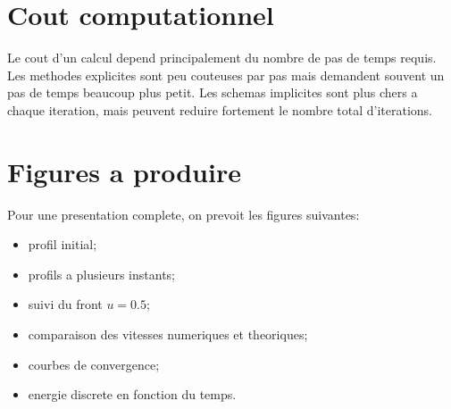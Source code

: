\documentclass[11pt,a4paper]{report}
\begin{document}
\section{Cout computationnel}
Le cout d'un calcul depend principalement du nombre de pas de temps requis.
Les methodes explicites sont peu couteuses par pas mais demandent souvent un pas de temps
beaucoup plus petit.
Les schemas implicites sont plus chers a chaque iteration, mais peuvent reduire fortement
le nombre total d'iterations.

\section{Figures a produire}
Pour une presentation complete, on prevoit les figures suivantes:
\begin{itemize}[leftmargin=1.5em]
  \item profil initial;
  \item profils a plusieurs instants;
  \item suivi du front $u=0.5$;
  \item comparaison des vitesses numeriques et theoriques;
  \item courbes de convergence;
  \item energie discrete en fonction du temps.
\end{itemize}
\end{document}
